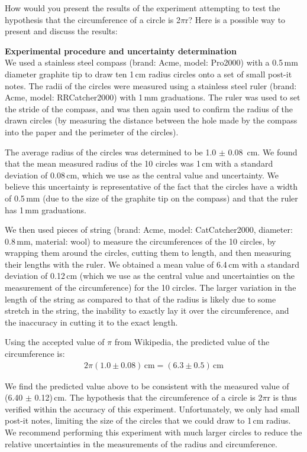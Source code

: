 \begin{example}{0pt}{How would you present the results of the experiment attempting to test the hypothesis that the circumference of a circle is 2$\pi$r?}{}
\label{ex:chapIntro_2pir}
Here is a possible way to present and discuss the results:

{\bf Experimental procedure and uncertainty determination}\\
We used a stainless steel compass (brand: Acme, model: Pro2000) with a 0.5\,mm diameter graphite tip to draw ten 1\,cm radius circles onto a set of small post-it notes. The radii of the circles were measured using a stainless steel ruler (brand: Acme, model: RRCatcher2000) with 1\,mm graduations. The ruler was used to set the stride of the compass, and was then again used to confirm the radius of the drawn circles (by measuring the distance between the hole made by the compass into the paper and the perimeter of the circles).

The average radius of the circles was determined to be 1.0 $\pm$ 0.08 \,cm. We found that the mean measured radius of the 10 circles was 1\,cm with a standard deviation of 0.08\,cm, which we use as the central value and uncertainty. We believe this uncertainty is representative of the fact that the circles have a width of 0.5\,mm (due to the size of the graphite tip on the compass) and that the ruler has 1\,mm graduations.  

We then used pieces of string (brand: Acme, model: CatCatcher2000, diameter: 0.8\,mm, material: wool) to measure the circumferences of the 10 circles, by wrapping them around the circles, cutting them to length, and then measuring their lengths with the ruler. We obtained a mean value of 6.4\,cm with a standard deviation of 0.12\,cm (which we use as the central value and uncertainties on the measurement of the circumference) for the 10 circles. The larger variation in the length of the string as compared to that of the radius is likely due to some stretch in the string, the inability to exactly lay it over the circumference, and the inaccuracy in cutting it to the exact length.

Using the accepted value of $\pi$ from Wikipedia, the predicted value of the circumference is:
\begin{align*}
2\pi(1.0\pm 0.08)\,\text{cm}=(6.3\pm 0.5)\,\text{cm}
\end{align*}

We find the predicted value above to be consistent with the measured value of (6.40 $\pm$ 0.12)\,cm. The hypothesis that the circumference of a circle is 2$\pi$r is thus verified within the accuracy of this experiment. Unfortunately, we only had small post-it notes, limiting the size of the circles that we could draw to 1\,cm radius. We recommend performing this experiment with much larger circles to reduce the relative uncertainties in the measurements of the radius and circumference.


\end{example}
